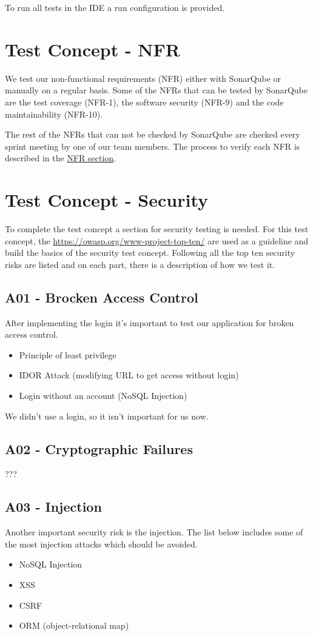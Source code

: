 To run all tests in the IDE a run configuration is provided.


\section{Test Concept - NFR}
We test our non-functional requirements (NFR) either with SonarQube or manually on a regular basis. Some of the NFRs that can be tested by SonarQube are the test coverage (NFR-1), the software security (NFR-9) and the code maintainability (NFR-10).

The rest of the NFRs that can not be checked by SonarQube are checked every sprint meeting by one of our team members.
The process to verify each NFR is described in the \hyperref[non-functional-requirements]{NFR section}.

\section{Test Concept - Security}
To complete the test concept a section for security testing is needed. For this test concept, the \href{OWASP Top Ten}{https://owasp.org/www-project-top-ten/} are used as a guideline and build the basics of the security test concept.
Following all the top ten security risks are listed and on each part, there is a description of how we test it.

\subsection{A01 - Brocken Access Control}
After implementing the login it's important to test our application for broken access control.

\begin{itemize}
  \item Principle of least privilege
  \item IDOR Attack (modifying URL to get access without login)
  \item Login without an account (NoSQL Injection)
\end{itemize}

We didn't use a login, so it isn't important for us now.

\subsection{A02 - Cryptographic Failures}
???

\subsection{A03 - Injection}
Another important security risk is the injection. The list below includes some of the most injection attacks which should be avoided.
\begin{itemize}
  \item NoSQL Injection
  \item XSS
  \item CSRF
  \item ORM (object-relational map)
\end{itemize}

